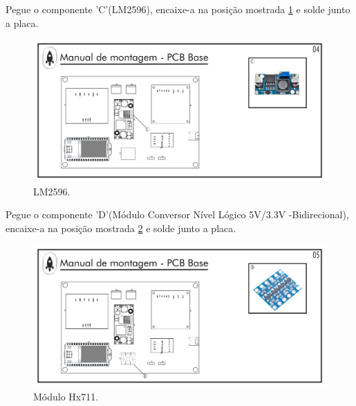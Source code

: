 \par Pegue o componente 'C'(LM2596), encaixe-a na posição mostrada \ref{fig:PCIBASE LM2596} e solde junto a placa.
\begin{figure}[H]
  \centering
  \includegraphics[width=\textwidth]{Figuras/BASE/Pg-04---PL-03.png}
  \caption{LM2596.}
  \label{fig:PCIBASE LM2596}
\end{figure}
\newpage

\par Pegue o componente 'D'(Módulo Conversor Nível Lógico 5V/3.3V -Bidirecional), encaixe-a na posição mostrada \ref{fig:PCIBASE Módulo CONVERSOR LOG  } e solde junto a placa.
\begin{figure}[H]
  \centering
  \includegraphics[width=\textwidth]{Figuras/BASE/Pg-05---PL-03.png}
  \caption{Módulo Hx711.}
  \label{fig:PCIBASE Módulo CONVERSOR LOG  }
\end{figure}

